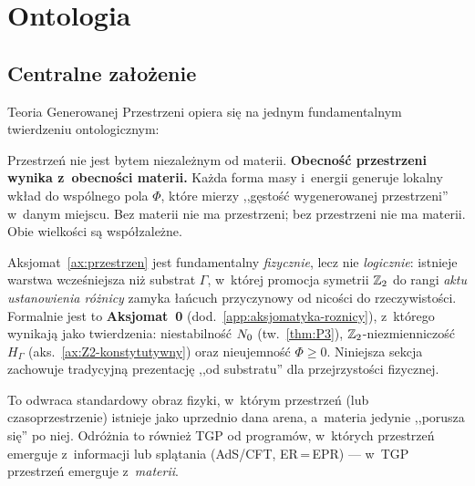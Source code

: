 \section{Ontologia}\label{sec:ontologia}

\subsection{Centralne za\l{}o\.zenie}

Teoria Generowanej Przestrzeni opiera si\k{e} na jednym fundamentalnym
twierdzeniu ontologicznym:

\begin{axiom}\label{ax:przestrzen}
Przestrze\'n nie jest bytem niezale\.znym od materii.
\textbf{Obecno\'s\'c przestrzeni wynika z~obecno\'sci materii.}
Ka\.zda forma masy i~energii generuje lokalny wk\l{}ad do wsp\'olnego
pola $\Phi$, kt\'ore mierzy ,,g\k{e}sto\'s\'c wygenerowanej przestrzeni''
w~danym miejscu. Bez materii nie ma przestrzeni; bez przestrzeni
nie ma materii. Obie wielko\'sci s\k{a} wsp\'o\l{}zale\.zne.
\end{axiom}

\begin{remark}\label{rem:pre-substrat}
Aksjomat~\ref{ax:przestrzen} jest fundamentalny \emph{fizycznie},
lecz nie \emph{logicznie}: istnieje warstwa wcze\'sniejsza ni\.z
substrat $\Gamma$, w~kt\'orej promocja symetrii $\mathbb{Z}_2$ do rangi
\emph{aktu ustanowienia r\'o\.znicy} zamyka \l{}a\'ncuch przyczynowy
od nico\'sci do rzeczywisto\'sci. Formalnie jest to
\textbf{Aksjomat~0} (dod.~\ref{app:aksjomatyka-roznicy}), z~kt\'orego
wynikaj\k{a} jako twierdzenia: niestabilno\'s\'c $N_0$
(tw.~\ref{thm:P3}), $\mathbb{Z}_2$-niezmienniczo\'s\'c $H_\Gamma$
(aks.~\ref{ax:Z2-konstytutywny}) oraz nieujemno\'s\'c $\Phi \geq 0$.
Niniejsza sekcja zachowuje tradycyjn\k{a} prezentacj\k{e}
,,od substratu'' dla przejrzysto\'sci fizycznej.
\end{remark}

To odwraca standardowy obraz fizyki, w~kt\'orym przestrze\'n (lub
czasoprzestrzenie) istnieje jako uprzednio dana arena, a~materia
jedynie ,,porusza si\k{e}'' po niej. Odr\'o\.znia to r\'ownie\.z TGP od
program\'ow, w~kt\'orych przestrze\'n emerguje z~informacji lub spl\k{a}tania
(AdS/CFT, ER\,=\,EPR) --- w~TGP przestrze\'n emerguje z~\emph{materii}.


